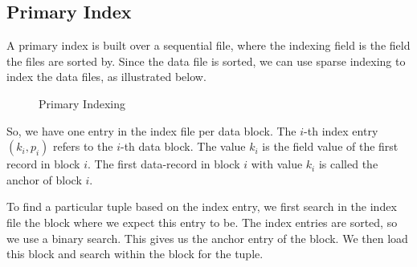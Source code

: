 \documentclass[a4paper, openany]{memoir}
\begin{document}
\subsection{Primary Index}
A primary index is built over a sequential file, where the indexing field is the field the files are sorted by. Since the data file is sorted, we can use sparse indexing to index the data files, as illustrated below.
\begin{figure}[H]
    \centering
    \caption{Primary Indexing}
\end{figure}
\noindent So, we have one entry in the index file per data block. The $i$-th index entry $(k_i, p_i)$ refers to the $i$-th data block. The value $k_i$ is the field value of the first record in block $i$. The first data-record in block $i$ with value $k_i$ is called the anchor of block $i$.

To find a particular tuple based on the index entry, we first search in the index file the block where we expect this entry to be. The index entries are sorted, so we use a binary search. This gives us the anchor entry of the block. We then load this block and search within the block for the tuple.
\end{document}
